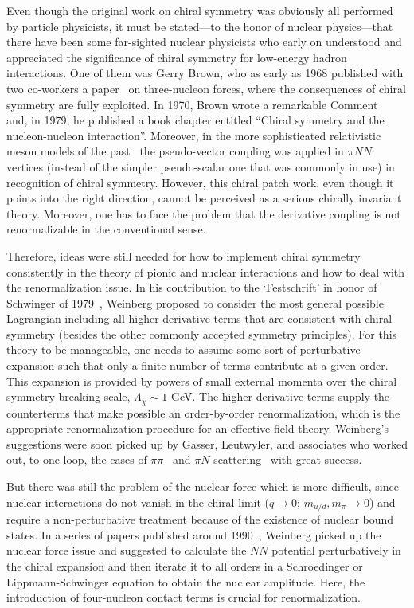 \documentclass[sort&compress,preprint,3p]{elsarticle}
\begin{document}
Even though the original work on chiral symmetry was obviously all performed by particle physicists, 
it must be stated---to the honor of nuclear physics---that 
there have been some far-sighted nuclear physicists who early on
understood and appreciated the significance of chiral symmetry for low-energy hadron
interactions. One of them was Gerry Brown, who as early as 1968 published with two co-workers
a paper~\cite{BGG68} on three-nucleon forces, where the consequences of chiral symmetry are fully
exploited.  In 1970, Brown wrote a remarkable Comment~\cite{Bro70} and, in 1979, he published
a book chapter entitled ``Chiral symmetry and the nucleon-nucleon
interaction''\cite{Bro79}.
Moreover, in the more sophisticated relativistic meson models of the 
past~\cite{MHE87,FT80,BM84,GOH92}
the pseudo-vector coupling was applied in $\pi NN$ vertices (instead of the simpler pseudo-scalar
one that was commonly in use) in recognition of chiral symmetry.
However, this chiral patch work, even though it points into the right direction,
cannot be perceived as a serious chirally invariant theory.
Moreover, one has to face the problem that the derivative coupling is not renormalizable
in the conventional sense. 

Therefore, ideas were still needed for how
to implement chiral symmetry consistently in the theory of pionic and nuclear interactions
and how to deal with the renormalization issue.
In his contribution to the `Festschrift' in honor of Schwinger of 1979~\cite{Wei79,Wei09}, Weinberg proposed
to consider the most general possible Lagrangian including all higher-derivative 
terms that are consistent
with chiral symmetry (besides the other commonly accepted symmetry principles).
For this theory to be manageable, one needs to assume some sort of perturbative
expansion such that only a finite number of terms contribute at a given order.
This expansion is provided by powers of small external momenta over the chiral symmetry
breaking scale, $\Lambda_\chi \sim 1$ GeV. The higher-derivative terms supply the counterterms
that make possible an order-by-order renormalization, which is the appropriate renormalization 
procedure for an effective field theory.
Weinberg's suggestions were soon picked up  
by Gasser, Leutwyler, and associates who worked out, to one loop, the cases of 
$\pi\pi$~\cite{GL84} and $\pi N$ scattering~\cite{GSS88} with great success.

But there was still the problem of the nuclear force which is more difficult, 
since nuclear interactions do not vanish in the chiral limit ($q\rightarrow 0$; $m_{u/d}, m_\pi \rightarrow 0$)
and require a non-perturbative
treatment because of the existence of nuclear bound states.
In a series of papers published around 1990~\cite{Wei90,Wei91,Wei92}, 
Weinberg picked up the nuclear force issue and suggested to calculate the $NN$ potential
perturbatively in the chiral expansion and then iterate it to all orders in a 
Schroedinger or Lippmann-Schwinger
equation to obtain the nuclear amplitude. 
Here, the introduction of four-nucleon contact terms is crucial for renormalization.
\end{document}
